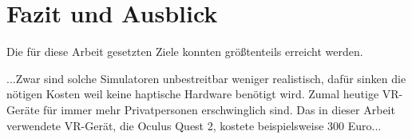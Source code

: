 \chapter{Fazit und Ausblick}

Die für diese Arbeit gesetzten Ziele konnten größtenteils erreicht werden. 

...Zwar sind solche Simulatoren unbestreitbar weniger realistisch, dafür sinken die nötigen Kosten weil keine haptische Hardware benötigt wird. Zumal heutige VR-Geräte für immer mehr Privatpersonen erschwinglich sind. Das in dieser Arbeit verwendete VR-Gerät, die Oculus Quest 2, kostete beispielsweise 300 Euro...


